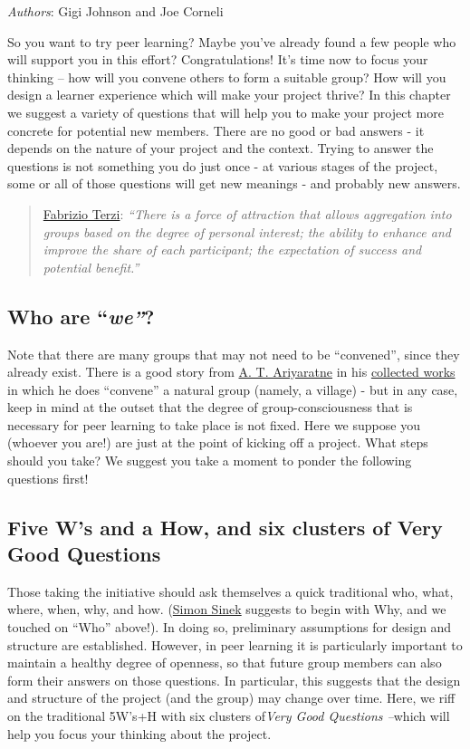 \emph{Authors}: Gigi Johnson and Joe Corneli

So you want to try peer learning? Maybe you've already found a few
people who will support you in this effort? Congratulations! It's time
now to focus your thinking -- how will you convene others to form a
suitable group? How will you design a learner experience which will make
your project thrive? In this chapter we suggest a variety of questions
that will help you to make your project more concrete for potential new
members. There are no good or bad answers - it depends on the nature of
your project and the context. Trying to answer the questions is not
something you do just once - at various stages of the project, some or
all of those questions will get new meanings - and probably new answers.

\begin{quote}
\href{http://campus.ftacademy.org/community/mod/groups/topicposts.php?topic=10060\&group\_guid=8500}{Fabrizio
Terzi}: \emph{``There is a force of attraction that allows aggregation
into groups based on the degree of personal interest; the ability to
enhance and improve the share of each participant; the expectation of
success and potential benefit.''}
\end{quote}

\subsection{Who are ``\emph{we''}?}

Note that there are many groups that may not need to be ``convened'',
since they already exist. There is a good story from
\href{http://www.sarvodayausa.org/learn/a-t-ariyartne/}{A. T.
Ariyaratne} in his
\href{http://www.sarvodaya.org/about/philosophy/collected-works-vol-1/rural-self-help}{collected
works} in which he does ``convene'' a natural group (namely, a village)
- but in any case, keep in mind at the outset that the degree of
group-consciousness that is necessary for peer learning to take place is
not fixed. Here we suppose you (whoever you are!) are just at the point
of kicking off a project. What steps should you take? We suggest you
take a moment to ponder the following questions first!

\subsection{Five W's and a How, and six clusters of Very Good Questions}

Those taking the initiative should ask themselves a quick traditional
who, what, where, when, why, and how.
(\href{http://en.wikipedia.org/wiki/Simon\_Sinek}{Simon Sinek} suggests
to begin with Why, and we touched on ``Who'' above!). In doing so,
preliminary assumptions for design and structure are established.
However, in peer learning it is particularly important to maintain a
healthy degree of openness, so that future group members can also form
their answers on those questions. In particular, this suggests that the
design and structure of the project (and the group) may change over
time. Here, we riff on the traditional 5W's+H with six clusters
of\emph{Very Good Questions --}which will help you focus your thinking
about the project.

